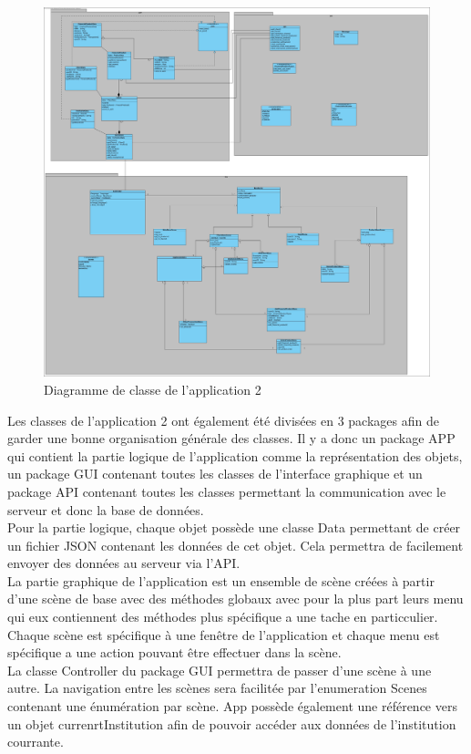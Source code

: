 \documentclass[../rapport.tex]{subfiles}
\begin{document}
\begin{figure}[h]
		\centering\includegraphics[scale=0.15]{ressources/photos_diagrammes/app2/classes2.jpg}
		\caption{Diagramme de classe de l'application 2}
\end{figure}
Les classes de l'application 2 ont également été divisées en 3 packages afin de garder une bonne organisation générale des classes.
Il y a donc un package APP qui contient la partie logique de l'application comme la représentation des objets, un package GUI contenant toutes les classes de l'interface graphique et un package API contenant toutes les classes permettant la communication avec le serveur et donc la base de données.\\

Pour la partie logique, chaque objet possède une classe Data permettant de créer un fichier JSON contenant les données de cet objet. Cela permettra de facilement envoyer des données au serveur via l'API.\\

La partie graphique de l'application est un ensemble de scène créées à partir d'une scène de base avec des méthodes globaux avec pour la plus part leurs menu qui eux contiennent des méthodes plus spécifique a une tache en particculier. Chaque scène est spécifique à une fenêtre de l'application et chaque menu est spécifique a une action pouvant être effectuer dans la scène.\\
La classe Controller du package GUI permettra de passer d'une scène à une autre. La navigation entre les scènes sera facilitée par l'enumeration Scenes contenant une énumération par scène. App possède également une référence vers un objet currenrtInstitution afin de pouvoir accéder aux données de l'institution courrante.\\
\end{document}
